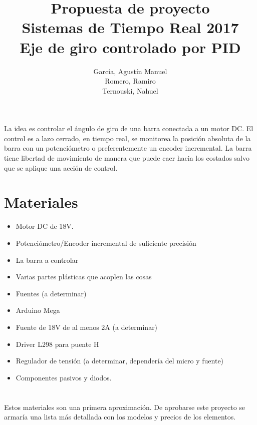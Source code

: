 \documentclass[a4paper,11pt]{article}
\title{Propuesta de proyecto
		\\Sistemas de Tiempo Real 2017
		\\{\Large Eje de giro controlado por PID}
}
\author{García, Agustín Manuel
\\Romero, Ramiro
\\Ternouski, Nahuel}
\date{}
\begin{document}
\maketitle

La idea es controlar el ángulo de giro de una barra conectada a un motor DC. El control es a lazo cerrado, en tiempo real, se monitorea la posición absoluta de la barra con un potenciómetro o preferentemente un encoder incremental. La barra tiene libertad de movimiento de manera que puede caer hacia los costados salvo que se aplique una acción de control. 

\section*{Materiales}
\begin{itemize}
	\item Motor DC de 18V.
	\item Potenciómetro/Encoder incremental de suficiente precisión
	\item La barra a controlar
	\item Varias partes plásticas que acoplen las cosas
	\item Fuentes (a determinar)
	\item Arduino Mega
	\item Fuente de 18V de al menos 2A (a determinar)
	\item Driver  L298 para puente H
	\item Regulador de tensión (a determinar, dependería del micro y fuente)
	\item Componentes pasivos y diodos.
\end{itemize}

\section*{}
Estos materiales son una primera aproximación. De aprobarse este proyecto se armaría una lista más detallada con los modelos y precios de los elementos. 
\end{document}
